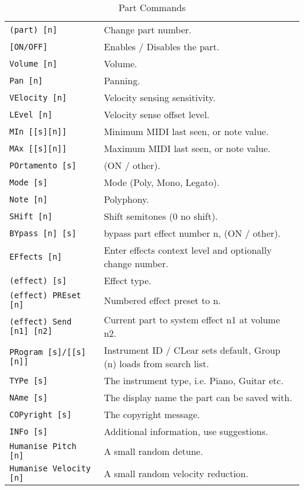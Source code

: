    \begin{table}[H]
      \centering
      \caption{Part Commands}
      \label{table:yoshimi_part_commands}
      \begin{tabular}{l l}
\texttt{(part) [n]} &
   Change part number.  \\
\texttt{[ON/OFF]} &
   Enables / Disables the part. \\
\texttt{Volume [n]} &
   Volume.  \\
\texttt{Pan [n]} &
   Panning.\\
\texttt{VElocity [n]} &
   Velocity sensing sensitivity. \\
\texttt{LEvel [n]} &
   Velocity sense offset level.  \\
\texttt{MIn [[s][n]]} &
   Minimum MIDI last seen, or note value.   \\
\texttt{MAx [[s][n]]} &
   Maximum MIDI last seen, or note value.   \\
\texttt{POrtamento [s]} &
   (ON / other).   \\
\texttt{Mode [s]} &
   Mode (Poly, Mono, Legato). \\
\texttt{Note [n]} &
   Polyphony.  \\
\texttt{SHift [n]} &
   Shift semitones (0 no shift). \\
\texttt{BYpass [n] [s]} &
   bypass part effect number n, (ON / other).  \\
\texttt{EFfects [n]} &
   Enter effects context level and optionally change number.  \\
 \texttt{(effect) [s]} &
   Effect type.   \\
 \texttt{(effect) PREset [n]} &
   Numbered effect preset to n. \\
 \texttt{(effect) Send [n1] [n2]} &
   Current part to system effect n1 at volume n2. \\
\texttt{PRogram [s]/[[s] [n]]} &
   Instrument ID / CLear sets default, Group (n) loads from search list. \\
\texttt{TYPe [s]} &
   The instrument type, i.e. Piano, Guitar etc. \\
\texttt{NAme [s]} &
   The display name the part can be saved with. \\
\texttt{COPyright [s]} &
   The copyright message. \\
\texttt{INFo [s]} &
   Additional information, use suggestions. \\
\texttt{Humanise Pitch [n]} &
   A small random detune. \\
\texttt{Humanise Velocity [n]} &
   A small random velocity reduction. \\

\end{tabular}
\end{table}
